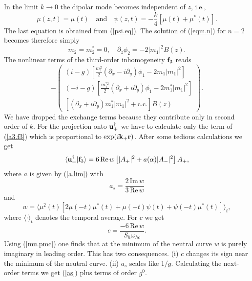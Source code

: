 In the limit $k\to 0$ the dipolar mode becomes independent of $z$,
i.e.,
\begin{equation}
  \mu(z,t)=\mu(t)\quad\mbox{and}\quad \psi(z,t)=-\frac{k}{4}[
   \mu(t)+\mu^*(t)].
  \label{a3.mu}
\end{equation}
The last equation is obtained from (\ref{psi.eq}). The
solution of (\ref{eqm.n}) for $n=2$ becomes therefore simply
\begin{equation}
  m_2=m_2^*=0,\quad \partial_z\phi_2=-2|m_1|^2B(z).
  \label{a3.u2}
\end{equation}
The nonlinear terms of the third-order inhomogeneity ${\bf f}_3$
reads
\begin{equation}
   -\left(\begin{array}{c}
   (i-g)\left[\frac{m_1^2}{2}(\partial_x-i\partial_y)\phi_1
   -2m_1|m_1|^2\right]\\
   (-i-g)\left[\frac{m_1^{*2}}{2}(\partial_x+i\partial_y)\phi_1
   -2m^*_1|m_1|^2\right]\\
   \left[(\partial_x+i\partial_y)m^*_1|m_1|^2+\mbox{c.c.}\right]B(z)
   \end{array}\right).
  \label{a3.f3}
\end{equation}
We have dropped the exchange terms because they contribute only in 
second order of $k$. For the projection onto ${\bf u}_+^\dagger$ we
have to calculate only the term of (\ref{a3.f3}) which is
proportional to $\exp(i{\bf k}_+{\bf r})$. After some tedious
calculations we get
\begin{displaymath}
  \langle{\bf u}_+^\dagger|{\bf f}_3\rangle=6\,\mbox{Re}\,w\left[
   |A_+|^2+a(\alpha)|A_-|^2\right]A_+,
\end{displaymath}
where $a$ is given by (\ref{a.lim}) with
\begin{equation}
  a_s=\frac{2\,\mbox{Im}\,w}{3\,\mbox{Re}\,w}
  \label{a3.as}
\end{equation}
and
\begin{equation}
  w=\langle\mu^2(t)[2\mu(-t)\mu^*(t)+\mu(-t)\psi(t)
   +\psi(-t)\mu^*(t)]\rangle_t,
  \label{a3.w}
\end{equation}
where $\langle\cdot\rangle_t$ denotes the temporal average. For $c$
we get
\begin{equation}
  c=\frac{-6\,\mbox{Re}\,w}{S_h\omega_{hc}}.
  \label{a3.c}
\end{equation}
Using (\ref{mu.pmc}) one finds that at the minimum of the neutral
curve $w$ is purely imaginary in leading order. This has two
consequences. (i) $c$ changes its sign near the minimum of the
neutral curve. (ii) $a_s$ scales like $1/g$. Calculating the
next-order terms we get (\ref{as}) plus terms of order $g^0$.

